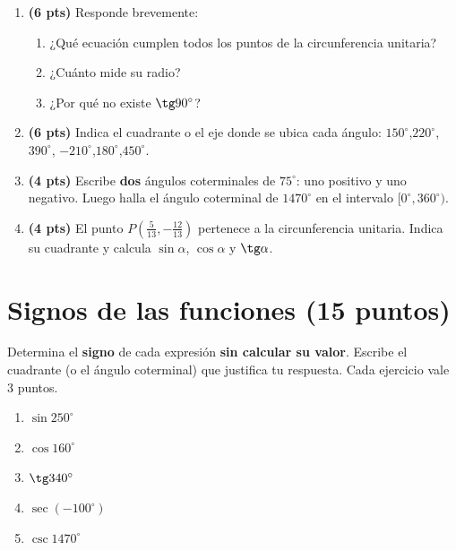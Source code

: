 \documentclass[12pt, letterpaper]{article}
\providecommand{\sen}{\sin}
\begin{document}
\begin{enumerate}[leftmargin=*, label=\textbf{\arabic*.}, itemsep=0.4em]
  \item \textbf{(6 pts)} Responde brevemente:
        \begin{enumerate}[label=\alph*), leftmargin=1.6em, nosep]
          \item ¿Qué ecuación cumplen todos los puntos de la circunferencia unitaria?
          \item ¿Cuánto mide su radio?
          \item ¿Por qué no existe $\tg 90^\circ$?
        \end{enumerate}

  \item \textbf{(6 pts)} Indica el cuadrante o el eje donde se ubica cada ángulo:
        $150^\circ$,\quad $220^\circ$,\quad $390^\circ$,\quad
        $-210^\circ$,\quad $180^\circ$,\quad $450^\circ$.

  \item \textbf{(4 pts)} Escribe \textbf{dos} ángulos coterminales de $75^\circ$:
        uno positivo y uno negativo. Luego halla el ángulo coterminal de
        $1470^\circ$ en el intervalo $[0^\circ,360^\circ)$.

  \item \textbf{(4 pts)} El punto $P\!\left(\frac{5}{13},-\frac{12}{13}\right)$
        pertenece a la circunferencia unitaria. Indica su cuadrante y calcula
        $\sen\alpha$, $\cos\alpha$ y $\tg\alpha$.
\end{enumerate}

\newpage
\section{Signos de las funciones (15 puntos)}

\begin{cuadroinfo}
  \small
  Determina el \textbf{signo} de cada expresión \textbf{sin calcular su valor}.
  Escribe el cuadrante (o el ángulo coterminal) que justifica tu respuesta.
  Cada ejercicio vale 3 puntos.
\end{cuadroinfo}

\begin{enumerate}[leftmargin=*, label=\textbf{\alph*)}, itemsep=1.1em]
  \item $\sen 250^\circ$
  \item $\cos 160^\circ$
  \item $\tg 340^\circ$
  \item $\sec(-100^\circ)$
  \item $\csc 1470^\circ$
\end{enumerate}
\end{document}
